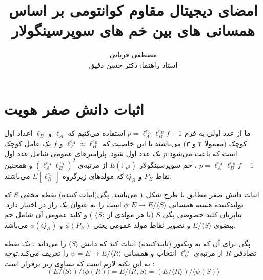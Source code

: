 \documentclass[12pt,a4paper]{article}
\title{امضای دیجیتال مقاوم کوانتومی بر اساس همسانی های بین خم های سوپرسینگولار}
\author{مصطفی قربانی
	\\[1cm]{ استاد راهنما: دکتر حسن دقیق}}
\date{}
\begin{document}
\maketitle
	
\section{اثبات دانش صفر هویت}\label{ZKPOI}
ما از عدد اولی به فرم 
$p = \ell_A^{e_A} \ell_B^{e_B} f \pm 1$
استفاده می‌کنیم که 
$\ell_A$
و
$\ell_B$
اعداد اول کوچک (معمولا ۲ و ۳) می‌باشند با این خاصیت که 
$\ell_A^{e_A} \approx \ell_B^{e_B} $
و 
$f$
یک عامل کوچک است که باعث می‌شود 
$p$
یک عدد اول شود.
پارامترهای عمومی شامل عدد اول 
$p = \ell_A^{e_A} \ell_B^{e_B} f \pm 1$
، خم سوپرسینگولار 
$E(\mathbb{F}_{p^2})$
از مرتبه‌ی 
$(\ell_A^{e_A} \ell_B^{e_B})^2$
و همچنین نقاط
$P_B$
و
$Q_B$
که مولدهای زیرگروه 
$E[ \ell_B^{e_B} ]$
می‌باشند.

اثبات دانش صفر مطابق با طرح شکل ۱ می‌باشد.
پگی(اثبات کننده) نقطه مخفی
$S$
که تولیدکننده هسته همسانی 
$\phi : E \rightarrow E/ \langle S \rangle $
است را به عنوان یک راز در اختیار دارد. بنابریان کلید خصوصی پگی 
$S$
(یا هر مولدی از
$ \langle S \rangle$
)
و کلید عمومی آن شامل خم بیضوی
$E/ \langle S \rangle$
 و تصویر نقاط مولد عمومی یعنی
 $\phi(P_B)$
 و
 $\phi(Q_B)$ 
 می‌باشد.
 
پگی برای آن که به ویکتور (تاییدکننده) اثبات کند که دانش 
$\langle S \rangle $
را می‌داند ، یک نقطه تصادفی 
$R$
از مرتبه‌ی
$\ell_B^{e_B}$
انتخاب و همسانی 
$\psi = E \rightarrow E / \langle R \rangle$
را تعریف می‌کند.توجه به این نکته لازم است که تساوی زیر برقرار است :
$$ (E /  \langle S \rangle) /  \langle \phi(R) \rangle = 
   E /  \langle R,S \rangle = 
   (E/ \langle R \rangle) /  \langle \psi(S) \rangle	
$$
\end{document}
